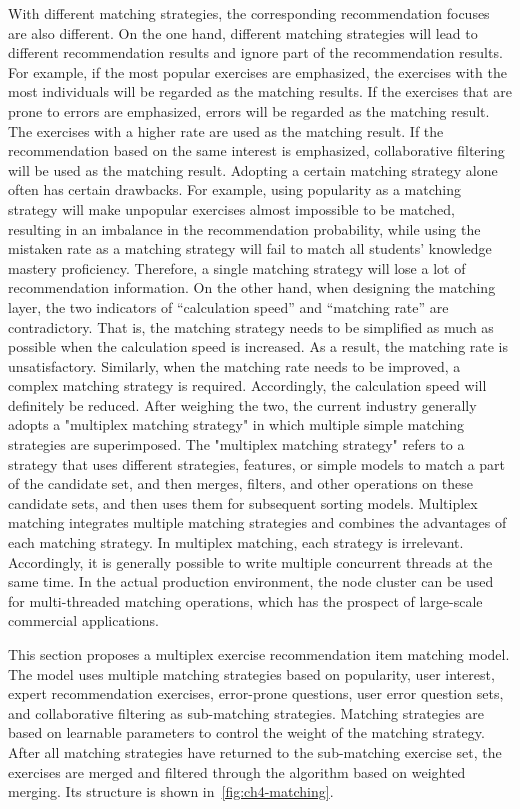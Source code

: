 With different matching strategies, the corresponding recommendation focuses are also different. On the one hand, different matching strategies will lead to different recommendation results and ignore part of the recommendation results. For example, if the most popular exercises are emphasized, the exercises with the most individuals will be regarded as the matching results. If the exercises that are prone to errors are emphasized, errors will be regarded as the matching result. The exercises with a higher rate are used as the matching result. If the recommendation based on the same interest is emphasized, collaborative filtering will be used as the matching result. Adopting a certain matching strategy alone often has certain drawbacks. For example, using popularity as a matching strategy will make unpopular exercises almost impossible to be matched, resulting in an imbalance in the recommendation probability, while using the mistaken rate as a matching strategy will fail to match all students' knowledge mastery proficiency. Therefore, a single matching strategy will lose a lot of recommendation information. On the other hand, when designing the matching layer, the two indicators of ``calculation speed'' and ``matching rate'' are contradictory. That is, the matching strategy needs to be simplified as much as possible when the calculation speed is increased. As a result, the matching rate is unsatisfactory. Similarly, when the matching rate needs to be improved, a complex matching strategy is required. Accordingly, the calculation speed will definitely be reduced. After weighing the two, the current industry generally adopts a "multiplex matching strategy" in which multiple simple matching strategies are superimposed. The "multiplex matching strategy" refers to a strategy that uses different strategies, features, or simple models to match a part of the candidate set, and then merges, filters, and other operations on these candidate sets, and then uses them for subsequent sorting models. Multiplex matching integrates multiple matching strategies and combines the advantages of each matching strategy. In multiplex matching, each strategy is irrelevant. Accordingly, it is generally possible to write multiple concurrent threads at the same time. In the actual production environment, the node cluster can be used for multi-threaded matching operations, which has the prospect of large-scale commercial applications.

This section proposes a multiplex exercise recommendation item matching model. The model uses multiple matching strategies based on popularity, user interest, expert recommendation exercises, error-prone questions, user error question sets, and collaborative filtering as sub-matching strategies. Matching strategies are based on learnable parameters to control the weight of the matching strategy. After all matching strategies have returned to the sub-matching exercise set, the exercises are merged and filtered through the algorithm based on weighted merging. Its structure is shown in~\figurename{\ref{fig:ch4-matching}}.

